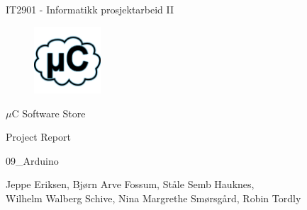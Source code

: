 \begin{titlepage}
\begin{center}
\vspace*{1in}
{\LARGE IT2901 - Informatikk prosjektarbeid II}
\par
\vspace{1cm}


\begin{figure}[ht!]
\centering
\includegraphics[width=25mm]{images/ic_launcher.png}
\label{overflow}
\end{figure}


{\LARGE $\mu$C Software Store}
\par
\vspace{0.6in}
{\LARGE Project Report}
\par
\vspace{0.2in}
{\Large 09\_Arduino}
\par
\vfill
\par
\vspace{0.5in}
Jeppe Eriksen, Bjørn Arve Fossum, Ståle Semb Hauknes,\\ Wilhelm Walberg Schive, Nina Margrethe Smørsgård, Robin Tordly\\
\par
\end{center}
\end{titlepage}
